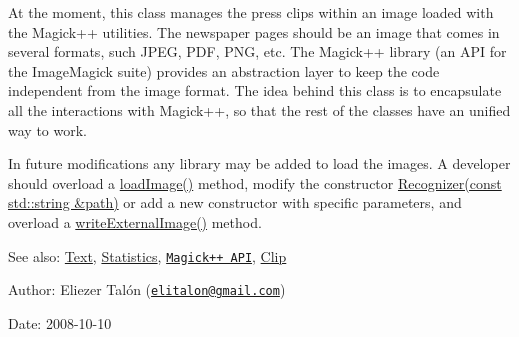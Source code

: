 At the moment, this class manages the press clips within an image loaded with the Magick++ utilities. The newspaper pages should be an image that comes in several formats, such JPEG, PDF, PNG, etc. The Magick++ library (an API for the ImageMagick suite) provides an abstraction layer to keep the code independent from the image format. The idea behind this class is to encapsulate all the interactions with Magick++, so that the rest of the classes have an unified way to work.

In future modifications any library may be added to load the images. A developer should overload a \hyperlink{class_recognizer_acc4244738f2577a0c344c3b3af22eb0}{loadImage()} method, modify the constructor \hyperlink{class_recognizer_50ffc181208bb07ae651aba6249ee7e4}{Recognizer(const std::string \&path)} or add a new constructor with specific parameters, and overload a \hyperlink{class_recognizer_559f62a3e3e2d0b799bab38e975b4b67}{writeExternalImage()} method.

\begin{Desc}
\item[See also:]\hyperlink{class_text}{Text}, \hyperlink{class_statistics}{Statistics}, \href{http://www.imagemagick.org/Magick++/}{\tt Magick++ API}, \hyperlink{class_clip}{Clip}\end{Desc}
\begin{Desc}
\item[Author:]Eliezer Talón (\href{mailto:elitalon@gmail.com}{\tt elitalon@gmail.com}) \end{Desc}
\begin{Desc}
\item[Date:]2008-10-10 \end{Desc}


